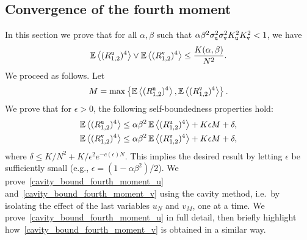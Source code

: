\documentclass[final,12pt]{colt2018} %
\newcommand{\utt}{\textup{\texttt{u}}}
\newcommand{\vtt}{\textup{\texttt{v}}}
\begin{document}
\subsection{Convergence of the fourth moment}
In this section we prove that for all $\alpha,\beta$ such that $\alpha \beta^2 \sigma_\utt^2\sigma_\vtt^2K_\utt^2K_\vtt^2<1$, we have
\[\E\left \langle (R^{\utt}_{1,2})^4\right \rangle \vee \E\left \langle (R^{\vtt}_{1,2})^4\right \rangle \le \frac{K(\alpha,\beta)}{N^2}.\]
We proceed as follows. Let
\[M = \max\left\{\E\left \langle (R^{\utt}_{1,2})^4\right \rangle, \E\left \langle (R^{\vtt}_{1,2})^4\right \rangle \right\}.\]
We prove that for $\epsilon>0$, the following self-boundedness properties hold:
\begin{align}
\E\left \langle (R^{\utt}_{1,2})^4\right \rangle &\le \alpha \beta^2\E\left \langle (R^{\utt}_{1,2})^4\right \rangle + K\epsilon M + \delta \label{cavity_bound_fourth_moment_u},\\
\E\left \langle (R^{\vtt}_{1,2})^4\right \rangle &\le \alpha \beta^2\E\left \langle (R^{\vtt}_{1,2})^4\right \rangle + K\epsilon M + \delta,
\label{cavity_bound_fourth_moment_v}
\end{align} 
where $\delta \le K/N^2 + K/\epsilon^2 e^{-c(\epsilon)N}$. This implies the desired result by letting $\epsilon$ be sufficiently small (e.g., $\epsilon = (1-\alpha\beta^2)/2$). We prove~\eqref{cavity_bound_fourth_moment_u} and~\eqref{cavity_bound_fourth_moment_v} using the cavity method, i.e.\ by isolating the effect of the last variables $u_N$ and $v_M$, one at a time. We prove~\eqref{cavity_bound_fourth_moment_u} in full detail, then briefly highlight how~\eqref{cavity_bound_fourth_moment_v} is obtained in a similar way.        
\end{document}
